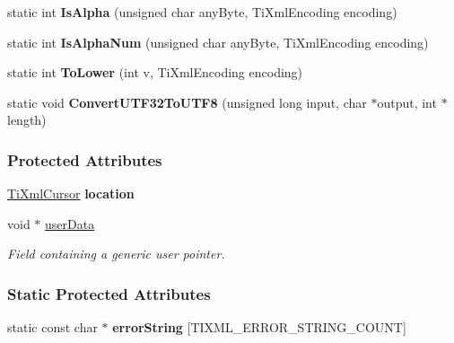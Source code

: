 \begin{DoxyCompactItemize}
\item 
\hypertarget{class_ti_xml_base_ae22522b2e8e1ac43102d16394f639fc8}{
static int {\bfseries IsAlpha} (unsigned char anyByte, TiXmlEncoding encoding)}
\label{class_ti_xml_base_ae22522b2e8e1ac43102d16394f639fc8}

\item 
\hypertarget{class_ti_xml_base_a321919055c115c78ded17f85a793f368}{
static int {\bfseries IsAlphaNum} (unsigned char anyByte, TiXmlEncoding encoding)}
\label{class_ti_xml_base_a321919055c115c78ded17f85a793f368}

\item 
\hypertarget{class_ti_xml_base_a799f17405a86a5c2029618e85f11a097}{
static int {\bfseries ToLower} (int v, TiXmlEncoding encoding)}
\label{class_ti_xml_base_a799f17405a86a5c2029618e85f11a097}

\item 
\hypertarget{class_ti_xml_base_a07c765e3a7f979d343e646ea797b180b}{
static void {\bfseries ConvertUTF32ToUTF8} (unsigned long input, char $\ast$output, int $\ast$length)}
\label{class_ti_xml_base_a07c765e3a7f979d343e646ea797b180b}

\end{DoxyCompactItemize}
\subsubsection*{Protected Attributes}
\begin{DoxyCompactItemize}
\item 
\hypertarget{class_ti_xml_base_a0d992580f3bc264909f898e942677a3c}{
\hyperlink{struct_ti_xml_cursor}{TiXmlCursor} {\bfseries location}}
\label{class_ti_xml_base_a0d992580f3bc264909f898e942677a3c}

\item 
\hypertarget{class_ti_xml_base_ab242c01590191f644569fa89a080d97c}{
void $\ast$ \hyperlink{class_ti_xml_base_ab242c01590191f644569fa89a080d97c}{userData}}
\label{class_ti_xml_base_ab242c01590191f644569fa89a080d97c}

\begin{DoxyCompactList}\small\item\em Field containing a generic user pointer. \item\end{DoxyCompactList}\end{DoxyCompactItemize}
\subsubsection*{Static Protected Attributes}
\begin{DoxyCompactItemize}
\item 
static const char $\ast$ {\bfseries errorString} \mbox{[}TIXML\_\-ERROR\_\-STRING\_\-COUNT\mbox{]}
\end{DoxyCompactItemize}
